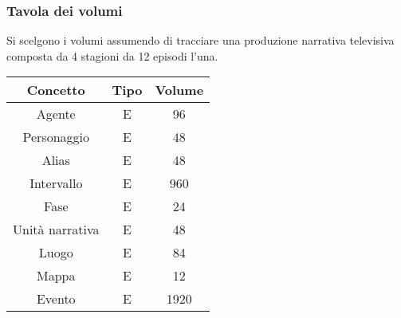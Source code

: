 \documentclass{article}
\begin{document}
\subsubsection{Tavola dei volumi}
Si scelgono i volumi assumendo di tracciare una produzione narrativa
televisiva composta da 4 stagioni da 12 episodi l'una.
\begin{center}\begin{tabular}{ |c|c|c| }
		\hline
		\textbf{Concetto} & \textbf{Tipo} & \textbf{Volume} \\
		\hline
		Agente            & E             & 96              \\
		\hline
		Personaggio       & E             & 48              \\
		\hline
		Alias             & E             & 48              \\
		\hline
		Intervallo        & E             & 960             \\
		\hline
		Fase              & E             & 24              \\
		\hline
		Unità narrativa   & E             & 48              \\
		\hline
		Luogo             & E             & 84              \\
		\hline
		Mappa             & E             & 12              \\
		\hline
		Evento            & E             & 1920            \\
		\hline
	\end{tabular}\end{center}
\end{document}
